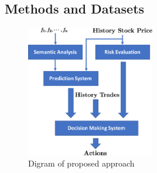 \documentclass[a4paper, 11pt]{article}
\begin{document}
\begin{spacing}{1}
    \section{Methods and Datasets}
    
    \begin{figure}
      \centering
      \includegraphics[width=0.5\textwidth]{diagram}
      \caption{Digram of proposed approach}
      \label{diagram_approach}
    \end{figure}
    

\end{spacing}
\end{document}
